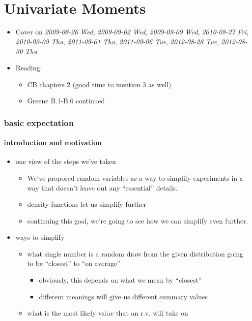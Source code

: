 
\part*{Univariate Moments}%

\begin{itemize}
\item Cover on \textit{2009-08-26 Wed}, \textit{2009-09-02 Wed}, \textit{2009-09-09 Wed},
     \textit{2010-08-27 Fri}, \textit{2010-09-09 Thu}, \textit{2011-09-01 Thu}, 
     \textit{2011-09-06 Tue}, \textit{2012-08-28 Tue}, \textit{2012-08-30 Thu}
\item Reading:
\begin{itemize}
\item CB chapters 2 (good time to mention 3 as well)
\item Greene B.1-B.6 continued
\end{itemize}
\end{itemize}
\section{basic expectation}
\label{sec-1}
\subsection{introduction and motivation}
\label{sec-1-1}

\begin{itemize}
\item one view of the steps we've taken
\begin{itemize}
\item We've proposed random variables as a way to simplify experiments
         in a way that doesn't leave out any ``essential'' details.
\item density functions let us simplify further
\item continuing this goal, we're going to see how we can simplify even further.
\end{itemize}
\item ways to simplify
\begin{itemize}
\item what single number is a random draw from the given distribution
         going to be ``closest'' to ``on average''
\begin{itemize}
\item obviously, this depends on what we mean by ``closest''
\item different meanings will give us different summary values
\end{itemize}
\item what is the most likely value that an r.v. will take on
\end{itemize}
\end{itemize}
